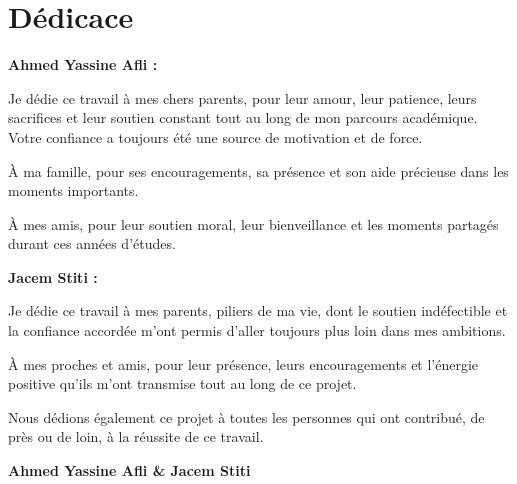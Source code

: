 \chapter*{Dédicace}

\textbf{Ahmed Yassine Afli :}

Je dédie ce travail à mes chers parents, pour leur amour, leur patience, leurs sacrifices et leur soutien constant tout au long de mon parcours académique. Votre confiance a toujours été une source de motivation et de force.

À ma famille, pour ses encouragements, sa présence et son aide précieuse dans les moments importants.

À mes amis, pour leur soutien moral, leur bienveillance et les moments partagés durant ces années d'études.

\vspace{0.5cm}

\textbf{Jacem Stiti :}

Je dédie ce travail à mes parents, piliers de ma vie, dont le soutien indéfectible et la confiance accordée m'ont permis d'aller toujours plus loin dans mes ambitions.

À mes proches et amis, pour leur présence, leurs encouragements et l'énergie positive qu'ils m'ont transmise tout au long de ce projet.

\vspace{0.8cm}

Nous dédions également ce projet à toutes les personnes qui ont contribué, de près ou de loin, à la réussite de ce travail.

\begin{flushright}
\textbf{Ahmed Yassine Afli \& Jacem Stiti}
\end{flushright}
